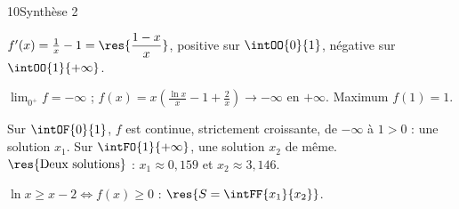 \begin{corrige}{10}{Synthèse 2}
\noindent
\begin{minipage}[t]{0.54\linewidth}\vspace{0pt}\raggedright
\begin{questions}
  \item $f'(x)=\frac1x-1=\res{\dfrac{1-x}{x}}$, positive sur $\intOO{0}{1}$, négative sur $\intOO{1}{+\infty}$.
  \item $\lim_{0^{+}}f=-\infty$ ; $f(x)=x\left(\frac{\ln x}{x}-1+\frac2x\right)\to-\infty$ en $+\infty$. Maximum $f(1)=1$.
  \item Sur $\intOF{0}{1}$, $f$ est continue, strictement croissante, de $-\infty$ à $1>0$ : une solution $x_1$. Sur
    $\intFO{1}{+\infty}$, une solution $x_2$ de même. $\res{\text{Deux solutions}}$ : $x_1\approx0{,}159$ et $x_2\approx3{,}146$.
  \item $\ln x\geq x-2\iff f(x)\geq0$ : $\res{S=\intFF{x_1}{x_2}}$.
\end{questions}
\end{minipage}\hfill
\begin{minipage}[t]{0.42\linewidth}\vspace{1mm}
\centering
\begin{tableau}
\end{tableau}
\end{minipage}
\end{corrige}

